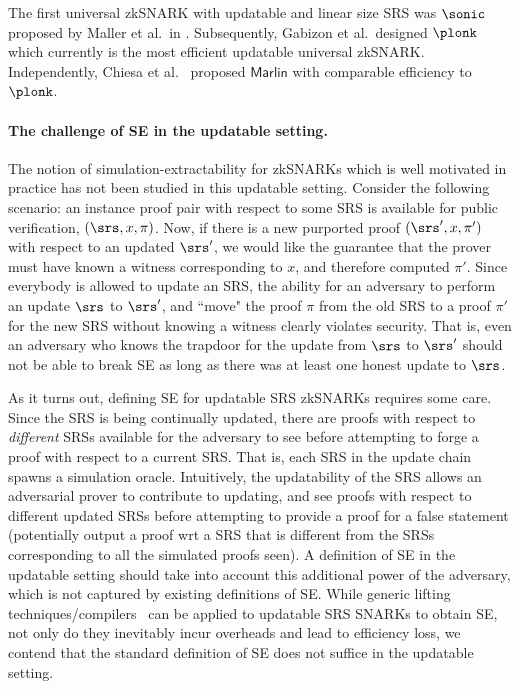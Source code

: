 The first universal zkSNARK with updatable and linear size SRS was
$\sonic$ proposed by Maller et al.~in \cite{CCS:MBKM19}. Subsequently, Gabizon et
al.~designed $\plonk$~\cite{EPRINT:GabWilCio19} which currently is the
most efficient updatable universal zkSNARK. Independently, Chiesa et
al.~\cite{EC:CHMMVW20} proposed $\textsf{Marlin}$ with comparable efficiency to
$\plonk$.

\paragraph{The challenge of SE in the updatable setting.}

The notion of simulation-extractability for zkSNARKs which is well motivated in practice has not been studied in this updatable setting. 
Consider the following scenario: an instance proof pair with respect to some SRS is available for public verification, $(\srs,x,\pi)$. Now, if there is a new purported proof $(\srs',x,\pi')$ with respect to an updated $\srs'$, we would like the guarantee that the prover must have known a witness corresponding to $x$, and therefore computed $\pi'$. Since everybody is allowed to update an SRS, the ability for an adversary to perform an update $\srs$ to $\srs'$, and ``move" the proof $\pi$ from the old SRS to a proof $\pi'$ for the new SRS without knowing a witness clearly violates security. That is, even an adversary who knows the trapdoor for the update from $\srs$ to $\srs'$ should not be able to break SE as long as there was at least one honest update to $\srs$.

As it turns out, defining SE for updatable SRS zkSNARKs requires some care. 
Since the SRS is being continually updated, there are proofs with respect to \textit{different} SRSs available for the adversary to see before attempting to forge a proof with respect to a current SRS. 
That is, each SRS in the update chain spawns a simulation oracle. Intuitively, the updatability of the SRS allows an adversarial prover to contribute to updating, and see proofs with respect to different updated SRSs before attempting to provide a proof for a false statement (potentially output a proof wrt a SRS that is different from the SRSs corresponding to all the simulated proofs seen). A definition of SE in the updatable setting should take into account this additional power of the adversary, which is not captured by existing definitions of SE. 
While generic lifting techniques/compilers~\cite{EPRINT:KZMQCP15,CCS:AbdRamSla20} can be applied to updatable SRS SNARKs to obtain SE, not only do they inevitably incur overheads and lead to efficiency loss, we contend that the standard definition of SE does not suffice in the updatable setting.


